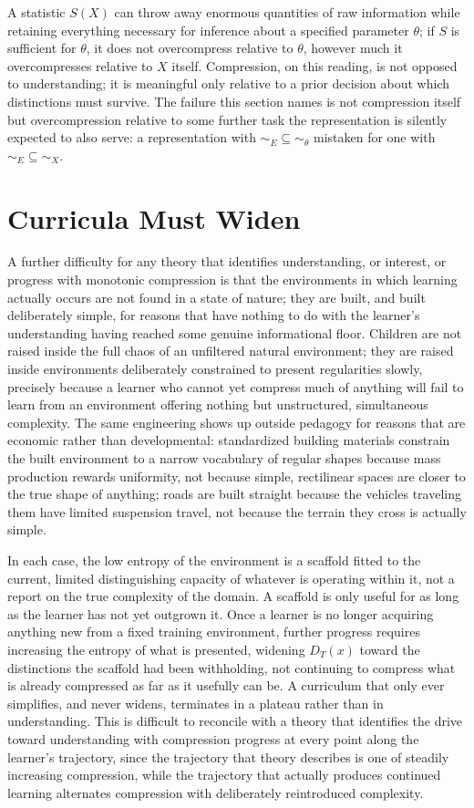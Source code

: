 A statistic $S(X)$ can throw away enormous quantities of raw information while retaining everything necessary for inference about a specified parameter $\theta$; if $S$ is sufficient for $\theta$, it does not overcompress relative to $\theta$, however much it overcompresses relative to $X$ itself. Compression, on this reading, is not opposed to understanding; it is meaningful only relative to a prior decision about which distinctions must survive. The failure this section names is not compression itself but overcompression relative to some further task the representation is silently expected to also serve: a representation with $\sim_E \subseteq \sim_\theta$ mistaken for one with $\sim_E \subseteq \sim_X$.

\section{Curricula Must Widen}

A further difficulty for any theory that identifies understanding, or interest, or progress with monotonic compression is that the environments in which learning actually occurs are not found in a state of nature; they are built, and built deliberately simple, for reasons that have nothing to do with the learner's understanding having reached some genuine informational floor. Children are not raised inside the full chaos of an unfiltered natural environment; they are raised inside environments deliberately constrained to present regularities slowly, precisely because a learner who cannot yet compress much of anything will fail to learn from an environment offering nothing but unstructured, simultaneous complexity. The same engineering shows up outside pedagogy for reasons that are economic rather than developmental: standardized building materials constrain the built environment to a narrow vocabulary of regular shapes because mass production rewards uniformity, not because simple, rectilinear spaces are closer to the true shape of anything; roads are built straight because the vehicles traveling them have limited suspension travel, not because the terrain they cross is actually simple.

In each case, the low entropy of the environment is a scaffold fitted to the current, limited distinguishing capacity of whatever is operating within it, not a report on the true complexity of the domain. A scaffold is only useful for as long as the learner has not yet outgrown it. Once a learner is no longer acquiring anything new from a fixed training environment, further progress requires increasing the entropy of what is presented, widening $D_T(x)$ toward the distinctions the scaffold had been withholding, not continuing to compress what is already compressed as far as it usefully can be. A curriculum that only ever simplifies, and never widens, terminates in a plateau rather than in understanding. This is difficult to reconcile with a theory that identifies the drive toward understanding with compression progress at every point along the learner's trajectory, since the trajectory that theory describes is one of steadily increasing compression, while the trajectory that actually produces continued learning alternates compression with deliberately reintroduced complexity.

